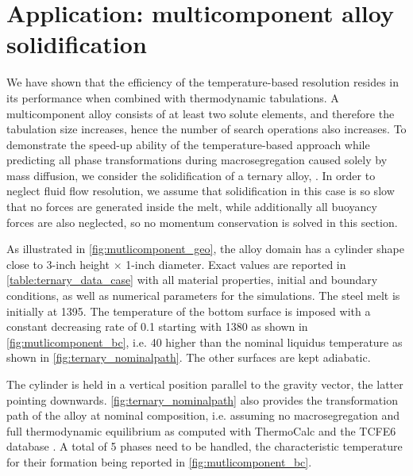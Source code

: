 

\section{Application: multicomponent alloy solidification}
%
We have shown that the efficiency of the temperature-based resolution resides in its performance when combined with 
thermodynamic tabulations. A multicomponent alloy consists of at least two solute elements, and 
therefore the tabulation size increases, hence the number of search operations also increases. 
To demonstrate the speed-up ability of the temperature-based approach while predicting all phase 
transformations during macrosegregation caused solely by mass diffusion, we consider the solidification of a ternary alloy, .
In order to neglect fluid flow resolution, we assume that solidification in this case is so slow that no forces are generated inside the melt, while
additionally all buoyancy forces are also neglected, so no momentum conservation is solved in this section.

As illustrated in \cref{fig:mutlicomponent_geo}, the alloy domain has a cylinder shape close to 3-inch height $\times$ 1-inch diameter. 
Exact values are reported in \cref{table:ternary_data_case} with all material properties, initial and boundary conditions, 
as well as numerical parameters for the simulations. The steel melt is initially at \SI{1395}{\udegC}. The 
temperature of the bottom surface is imposed with a constant decreasing rate of \SI{0.1}{\uCR} starting 
with \SI{1380}{\udegC} as shown in \cref{fig:mutlicomponent_bc}, i.e. \SI{40}{\udegC} higher than the nominal liquidus temperature as shown 
in \cref{fig:ternary_nominalpath}. The other surfaces are kept adiabatic. 

The cylinder is held in a vertical position parallel to the gravity vector, the latter pointing downwards.
\cref{fig:ternary_nominalpath} also provides the transformation path of the alloy at nominal composition, i.e. assuming no macrosegregation and full 
thermodynamic equilibrium as computed with ThermoCalc and the TCFE6 database \citep{tcfe6_tcfe6:_2010, andersson_thermo-calc_2002}. 
A total of 5 phases need to be handled, the characteristic temperature for their formation being reported 
in \cref{fig:mutlicomponent_bc}.


